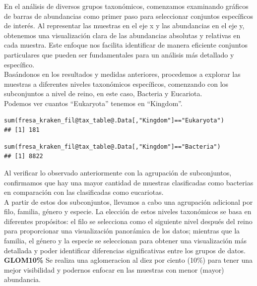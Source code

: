 En el análisis de diversos grupos taxonómicos, comenzamos examinando gráficos de barras de abundancias como primer paso para seleccionar conjuntos específicos de interés. Al representar las muestras en el eje x y las abundancias en el eje y, obtenemos una visualización clara de las abundancias absolutas y relativas en cada muestra. Este enfoque nos facilita identificar de manera eficiente conjuntos particulares que pueden ser fundamentales para un análisis más detallado y específico.\\

Basándonos en los resultados y medidas anteriores, procedemos a explorar las muestras a diferentes niveles taxonómicos específicos, comenzando con los subconjuntos a nivel de reino, en este caso, Bacteria y Eucariota.\\

Podemos ver cuantos “Eukaryota” tenemos en “Kingdom”.
\begin{lstlisting}[basicstyle=\small] 
sum(fresa_kraken_fil@tax_table@.Data[,"Kingdom"]=="Eukaryota")
## [1] 181
\end{lstlisting}
\begin{lstlisting}[basicstyle=\small] 
sum(fresa_kraken_fil@tax_table@.Data[,"Kingdom"]=="Bacteria")
## [1] 8822
\end{lstlisting}

Al verificar lo observado anteriormente con la agrupación de subconjuntos, confirmamos que hay una mayor cantidad de muestras clasificadas como bacterias en comparación con las clasificadas como eucariotas.\\

A partir de estos dos subconjuntos, llevamos a cabo una agrupación adicional por filo, familia, género y especie. La elección de estos niveles taxonómicos se basa en diferentes propósitos: el filo se selecciona como el siguiente nivel después del reino para proporcionar una visualización panorámica de los datos; mientras que la familia, el género y la especie se seleccionan para obtener una visualización más detallada y poder identificar diferencias significativas entre los grupos de datos.\\

\textbf{GLOM10\%}
Se realiza una aglomeracion al diez por ciento (10\%)  para tener una mejor visibilidad y podernos enfocar en las muestras con menor (mayor) abundancia. \\

